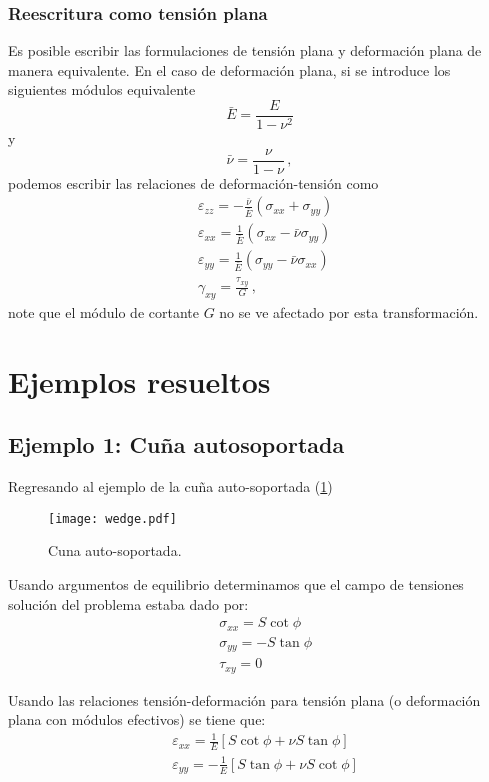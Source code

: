\documentclass[../notas medios.tex]{subfiles}
\begin{document}
\subsubsection{Reescritura como tensión plana}
Es posible escribir las formulaciones de tensión plana y deformación plana de manera equivalente. En el caso de deformación plana, si se introduce los siguientes módulos equivalente
\[\bar E = \frac{E}{1 - \nu^2}\]
y
\[\bar \nu  = \frac{\nu }{1 - \nu}\, ,\]
podemos escribir las relaciones de deformación-tensión como
\begin{align*}
& \varepsilon_{zz} =  - \frac{\bar\nu}{\bar E}(\sigma_{xx} + \sigma_{yy}) \\
& \varepsilon_{xx} =    \frac{1}{\bar E}(\sigma_{xx} - \bar\nu \sigma_{yy})\\
& \varepsilon_{yy} = \frac{1}{\bar E}(\sigma_{yy} - \bar\nu \sigma_{xx})\\
& \gamma_{xy} = \frac{\tau_{xy}}{G}\, ,
\end{align*}
note que el módulo de cortante \(G\) no se ve afectado por esta transformación.

\section{Ejemplos resueltos}
\subsection*{Ejemplo 1: Cuña autosoportada}

Regresando al ejemplo de la cuña auto-soportada (\cref{wedgee})
\begin{figure}[H]
\centering
	\texttt{[image: wedge.pdf]}
	\caption{Cuna auto-soportada.}
	\label{wedgee}
\end{figure}


Usando argumentos de equilibrio determinamos que el campo de tensiones solución del problema estaba dado por:
\begin{equation} \label{tencuna}
\begin{split}
& \sigma_{xx} = S \cot\phi \\
& \sigma_{yy} =  - S \tan\phi \\
& \tau_{xy} = 0
\end{split}
\end{equation}

Usando las relaciones tensión-deformación para tensión plana (o deformación plana con módulos efectivos) se tiene que:
\begin{align*}
&\varepsilon_{xx} = \frac{1}{E}[S \cot\phi  + \nu S \tan\phi]\\
&\varepsilon_{yy} =  - \frac{1}{E}[S \tan\phi  + \nu S \cot\phi]
\end{align*}
\end{document}
